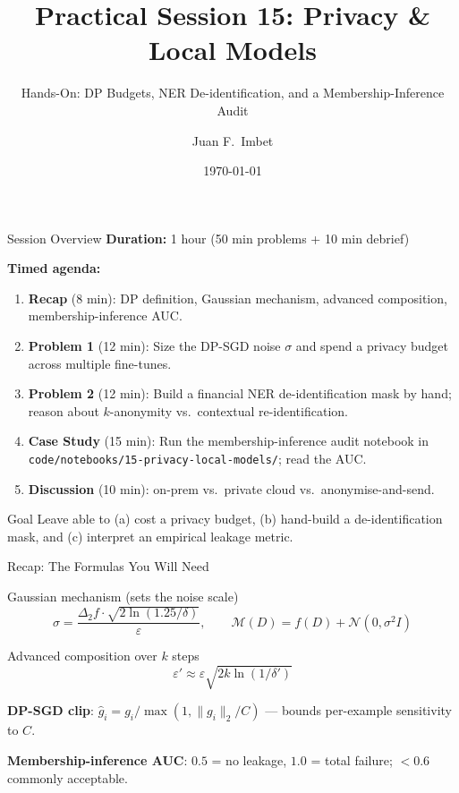 \documentclass[9pt,t]{beamer}
\title{Practical Session 15: Privacy \& Local Models}
\subtitle{Hands-On: DP Budgets, NER De-identification, and a Membership-Inference Audit}
\author{Juan F.\ Imbet}
\institute{Paris Dauphine -- PSL University}
\date{\today}
\begin{document}
\begin{frame}\titlepage\end{frame}

\begin{frame}{Session Overview}
\textbf{Duration:} 1 hour (50 min problems + 10 min debrief)

\medskip
\textbf{Timed agenda:}
\begin{enumerate}
  \item \textbf{Recap} (8 min): DP definition, Gaussian mechanism, advanced composition,
        membership-inference AUC.
  \item \textbf{Problem 1} (12 min): Size the DP-SGD noise $\sigma$ and spend a
        privacy budget across multiple fine-tunes.
  \item \textbf{Problem 2} (12 min): Build a financial NER de-identification mask by
        hand; reason about $k$-anonymity vs.\ contextual re-identification.
  \item \textbf{Case Study} (15 min): Run the membership-inference audit notebook in
        \texttt{code/notebooks/15-privacy-local-models/}; read the AUC.
  \item \textbf{Discussion} (10 min): on-prem vs.\ private cloud vs.\ anonymise-and-send.
\end{enumerate}

\medskip
\begin{block}{Goal}
Leave able to (a) cost a privacy budget, (b) hand-build a de-identification mask, and
(c) interpret an empirical leakage metric.
\end{block}
\end{frame}

\begin{frame}{Recap: The Formulas You Will Need}
\begin{block}{Gaussian mechanism (sets the noise scale)}
\[
\sigma = \frac{\Delta_2 f \cdot \sqrt{2\ln(1.25/\delta)}}{\varepsilon},
\qquad \mathcal{M}(D) = f(D) + \mathcal{N}(0,\sigma^2 I)
\]
\end{block}

\begin{block}{Advanced composition over $k$ steps}
\[
\varepsilon' \approx \varepsilon\sqrt{2k\ln(1/\delta')}
\]
\end{block}

\textbf{DP-SGD clip}: $\hat{g}_i = g_i / \max(1, \|g_i\|_2 / C)$ --- bounds per-example
sensitivity to $C$.

\medskip
\textbf{Membership-inference AUC}: $0.5$ = no leakage, $1.0$ = total failure;
$<0.6$ commonly acceptable.
\end{frame}
\end{document}
